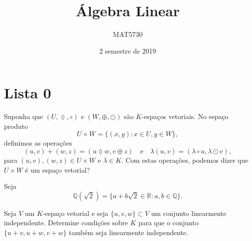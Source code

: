 \documentclass[11pt,a4paper]{article}
\title{Álgebra Linear}
\author{MAT5730}
\date{2 semestre de 2019}
\begin{document}
\maketitle
\tableofcontents
\newpage

\section{\textcolor{Floresta}{Lista 0}}

\begin{exercicio}
Suponha que $(U, \lozenge, \circ)$ e $(W, \oplus, \odot)$ são $K$-espaços vetoriais. No espaço produto
\[U \times W = \{(x, y) : x \in U, y \in W\},\]
definimos as operações
\[
(u, v) + (w,z) = (u \lozenge w, v \oplus z) \quad \mbox{e} \quad \lambda(u,v) = (\lambda \circ u, \lambda \odot v),
\]
para $(u,v), (w,z) \in U \times W$ e $\lambda \in K.$ Com estas operações, podemos dizer que $U \times W$ é
um espaço vetorial?
\end{exercicio}
\solucao{}
\begin{exercicio} Seja
\[
\mathbb{Q}(\sqrt{2}) = \{ a + b \sqrt{2} \in \mathbb{R} : a,b \in \mathbb{Q} \}.
\]
\end{exercicio}


\begin{exercicio} Seja $V$ um $K$-espaço vetorial e seja $\{u, v, w\} \subset V$ um conjunto linearmente independente.
Determine condições sobre $K$ para que o conjunto $\{u + v, u + w, v + w\}$ também seja linearmente independente.
\end{exercicio}
\end{document}
